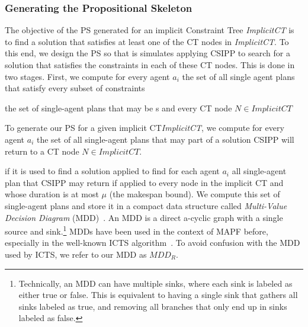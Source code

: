 \documentclass[review]{elsarticle}
\newcommand{\mddr}{\ensuremath{MDD_R}\xspace}
\newcommand{\implicitct}{\textit{ImplicitCT}\xspace}
\newcommand{\decidet}{\ensuremath{\mathit{DECIDE_T}}\xspace}
\newcommand{\ccbs}{\ac{CCBS}\xspace}
\newcommand{\ct}{\ac{CT}\xspace}
\newcommand{\csipp}{\ac{CSIPP}\xspace}
\newcommand{\ps}{\ac{PS}\xspace}
\newcommand{\mapfr}{\ac{MAPF}$_R$\xspace}
\newcommand{\mapf}{\ac{MAPF}\xspace}
\begin{document}
\subsubsection{Generating the Propositional Skeleton}
\label{sec:propositional-skeleton}


The objective of the \ps generated for an implicit Constraint Tree \implicitct is to find a solution that satisfies at least one of the \ct nodes in \implicitct. 
To this end, we design the \ps so that is simulates applying \csipp to search for a solution that satisfies the constraints in each of these \ct nodes. 
This is done in two stages. 
First, we compute for every agent $a_i$ the set of all single agent plans that satisfy every subset of constraints 


the set of single-agent plans 
that may be s
and every \ct node $N\in \implicitct$ 


To generate our \ps for a given implicit \ct \implicitct, we compute for every agent $a_i$ the set of all single-agent plans that may part of a solution \csipp will return to a \ct node $N\in \implicitct$. 

if it is used to find a solution applied to find 
for each agent $a_i$ all single-agent plan that \csipp may return if applied to every node in the implicit \ct
and whose duration is at most $\mu$ (the makespan bound). 
We compute this set of single-agent plans and store it in a compact data structure called
\emph{Multi-Value Decision Diagram} (MDD)~\cite{srinivasan1990algorithms}. 
An MDD is a direct a-cyclic graph with a single source and sink.\footnote{Technically, an MDD can have multiple sinks, where each sink is labeled as either true or false. This is equivalent to having a single sink that gathers all sinks labeled as true, and removing all branches that only end up in sinks labeled as false.}
MDDs have been used in the context of \mapf before, especially in the well-known ICTS algorithm~\cite{sharon2013increasing}. To avoid confusion with the MDD used by ICTS, we refer to our MDD as \mddr. 
\end{document}
